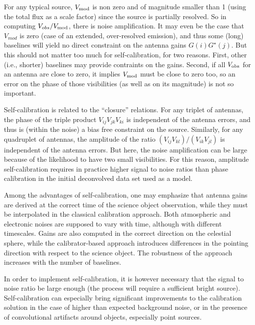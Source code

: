 For any typical source, $V_{\rm mod}$ is non zero and of magnitude 
smaller than 1 (using the total flux as a scale factor) since the 
source is partially resolved. So in computing $V_{obs}/V_{\rm mod}$, 
there is noise amplification. It may even be the case that $V_{mod}$ is 
zero (case of an extended, over-resolved emission), and thus some 
(long) baselines will yield no direct constraint on the antenna gains 
$G(i) G^{{\star}}(j)$. But this should not matter too much for 
self-calibration, for two reasons. First, other (i.e., shorter) 
baselines may provide contraints on the gains. Second, if all 
$V_{\rm obs}$ for an antenna are
close to zero, it implies $V_{\rm mod}$ must be close to zero too, 
so an error on the phase of those visibilities (as well as on
its magnitude) is not so important. 

Self-calibration is related to the ``closure'' relations. For any triplet 
of antennas, the phase of the triple product $V_{ij} V_{jk} V_{ki}$ is 
independent of the antenna errors, and thus is (within the noise) a 
bias free constraint on the source. Similarly, for any quadruplet of 
antennas, the amplitude of the ratio $(V_{ij} V_{kl}) / (V_{ik} 
V_{jl})$  is independent of the antenna errors. But here, the noise 
amplification can be large because of the likelihood to have two small 
visibilities. For this reason, amplitude self-calibration requires in 
practice higher signal to noise ratios than phase calibration in the 
initial deconvolved data set used as a model. 

Among the advantages of self-calibration, one may emphasize that 
antenna gains are derived at the correct time of the science object 
observation, while they must be interpolated in the classical 
calibration approach. Both atmospheric and electronic noises are 
supposed to vary with time, although with different timescales. Gains 
are also computed in the correct direction on the celestial sphere, 
while the calibrator-based approach introduces differences in the 
pointing direction with respect to the science object. The robustness 
of the approach increases with the number of baselines. 

In order to implement self-calibration, it is however necessary that 
the signal to noise ratio be large enough (the process will require a 
sufficient bright source). Self-calibration can especially bring 
significant improvements to the calibration solution in the case of 
higher than expected background noise, or in the presence of 
convolutional artifacts around objects, especially point sources.

